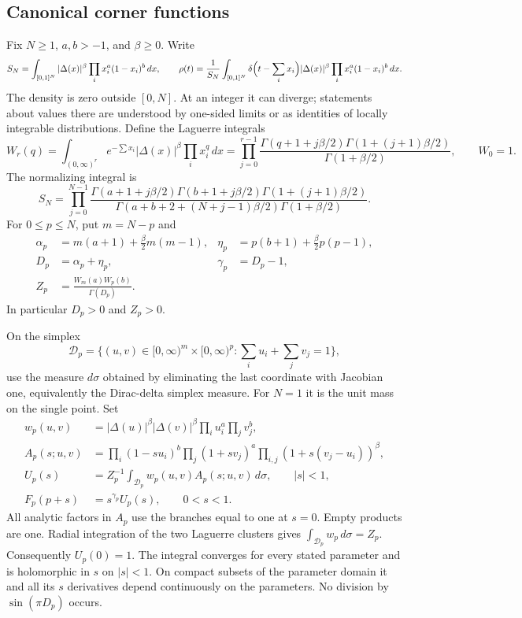 \documentclass[11pt,a4paper]{article}
\theoremstyle{definition}
\theoremstyle{remark}
\numberwithin{equation}{section}
\begin{document}
\subsection{Canonical corner functions}

Fix $N\ge1$, $a,b>-1$, and $\beta\ge0$. Write
\[
 S_N=\int_{[0,1]^N}|\Delta(x)|^\beta
                   \prod_i x_i^a(1-x_i)^b\,dx,
 \qquad
 \rho(t)=\frac1{S_N}\int_{[0,1]^N}
       \delta\Bigl(t-\sum_i x_i\Bigr)|\Delta(x)|^\beta
                   \prod_i x_i^a(1-x_i)^b\,dx.
\]
The density is zero outside $[0,N]$. At an integer it can diverge;
statements about values there are understood by one-sided limits or
as identities of locally integrable distributions.
Define the Laguerre integrals
\[
 W_r(q)=\int_{(0,\infty)^r}e^{-\sum x_i}|\Delta(x)|^\beta
              \prod_i x_i^q\,dx
 =\prod_{j=0}^{r-1}
   \frac{\Gamma(q+1+j\beta/2)\Gamma(1+(j+1)\beta/2)}
        {\Gamma(1+\beta/2)},\qquad W_0=1.
\]
The normalizing integral is
\[
 S_N=\prod_{j=0}^{N-1}
 \frac{\Gamma(a+1+j\beta/2)\Gamma(b+1+j\beta/2)
             \Gamma(1+(j+1)\beta/2)}
 {\Gamma(a+b+2+(N+j-1)\beta/2)\Gamma(1+\beta/2)}.
\]
For $0\le p\le N$, put $m=N-p$ and
\begin{align*}
 \alpha_p&=m(a+1)+\tfrac\beta2m(m-1),&
 \eta_p&=p(b+1)+\tfrac\beta2p(p-1),\\
 D_p&=\alpha_p+\eta_p,& \gamma_p&=D_p-1,\\
 Z_p&=\frac{W_m(a)W_p(b)}{\Gamma(D_p)}.
\end{align*}
In particular $D_p>0$ and $Z_p>0$.

On the simplex
\[
 \mathcal D_p=\{(u,v)\in[0,\infty)^m\times[0,\infty)^p:
                       \sum_i u_i+\sum_j v_j=1\},
\]
use the measure $d\sigma$ obtained by eliminating the last coordinate
with Jacobian one, equivalently the Dirac-delta simplex measure.
For $N=1$ it is the unit mass on the single point. Set
\begin{align*}
 w_p(u,v)&=|\Delta(u)|^\beta|\Delta(v)|^\beta
                       \prod_i u_i^a\prod_j v_j^b,\\
 A_p(s;u,v)&=\prod_i(1-su_i)^b\prod_j(1+sv_j)^a
                      \prod_{i,j}(1+s(v_j-u_i))^\beta,\\
 U_p(s)&=Z_p^{-1}\int_{\mathcal D_p}w_p(u,v)A_p(s;u,v)\,d\sigma,
                       \qquad |s|<1,\\
 F_p(p+s)&=s^{\gamma_p}U_p(s),\qquad 0<s<1.
\end{align*}
All analytic factors in $A_p$ use the branches equal to one at $s=0$.
Empty products are one. Radial integration of the two Laguerre
clusters gives $\int_{\mathcal D_p}w_p\,d\sigma=Z_p$.
Consequently $U_p(0)=1$. The integral converges for every stated
parameter and is holomorphic in $s$ on $|s|<1$. On compact subsets of
the parameter domain it and all its $s$ derivatives depend continuously
on the parameters. No division by $\sin(\pi D_p)$ occurs.
\end{document}
